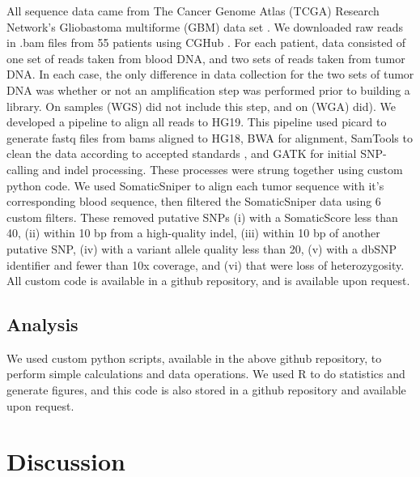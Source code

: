 \documentclass[11pt]{article} %
\begin{document}
All sequence data came from The Cancer Genome Atlas (TCGA) Research Network's Gliobastoma multiforme (GBM) data set \cite{TCGA-GBM}. We downloaded raw reads in .bam files from 55 patients using CGHub \cite{CGHub}. For each patient, data consisted of one set of reads taken from blood DNA, and two sets of reads taken from tumor DNA. In each case, the only difference in data collection for the two sets of tumor DNA was whether or not an amplification step was performed prior to building a library. On samples (WGS) did not include this step, and on (WGA) did). We developed a pipeline to align all reads to HG19. This pipeline used picard \cite{picard} to generate fastq files from bams aligned to HG18, BWA \cite{BWA} for alignment, SamTools \cite{SAMtools} to clean the data according to accepted standards \cite{seq-standards}, and GATK \cite{GATK} for initial SNP-calling and indel processing. These processes were strung together using custom python code. We used SomaticSniper \cite{SomaticSniper} to align each tumor sequence with it's corresponding blood sequence, then filtered the SomaticSniper data using 6 custom filters. These removed putative SNPs (i) with a SomaticScore less than 40, (ii) within 10 bp from a high-quality indel, (iii) within 10 bp of another putative SNP, (iv) with a variant allele quality less than 20, (v) with a dbSNP \cite{dbSNP} identifier and fewer than 10x coverage, and (vi) that were loss of heterozygosity. All custom code is available in a github repository, and is available upon request.

\subsection{Analysis}

We used custom python scripts, available in the above github repository, to perform simple calculations and data operations. We used R \cite{Rsoftware} to do statistics and generate figures, and this code is also stored in a github repository and available upon request.  

\section{Discussion}
\end{document}
